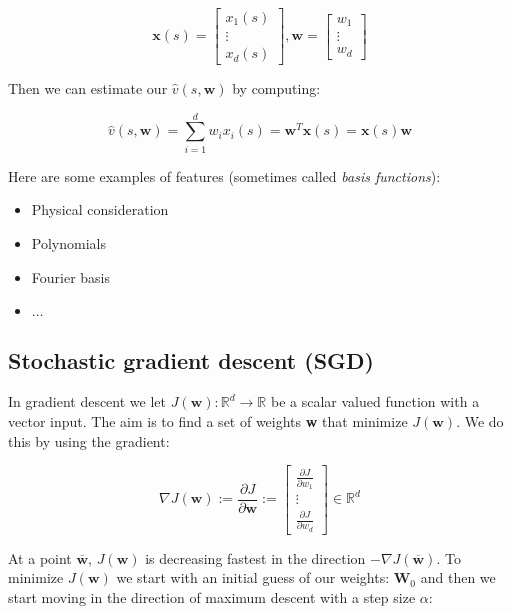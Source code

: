 	\begin{equation}
		\textbf{x}(s) = \begin{bmatrix} x_1(s) \\ \vdots \\ x_d(s) \end{bmatrix}, \textbf{w} = \begin{bmatrix} w_1 \\ \vdots \\ w_d \end{bmatrix}
	\end{equation}

Then we can estimate our $\hat{v}(s,\textbf{w})$ by computing:

	\begin{equation}
		\hat{v}(s, \textbf{w}) = \sum_{i=1}^{d}w_ix_i(s) = \textbf{w}^{T}\textbf{x}(s) = \textbf{x}(s)\textbf{w}
	\end{equation}

Here are some examples of features (sometimes called \emph{basis functions}):

\begin{itemize}
	\item Physical consideration
	\item Polynomials
	\item Fourier basis
	\item $\ldots$
\end{itemize}

\subsection{Stochastic gradient descent (SGD)}
In gradient descent we let $J(\textbf{w}): \mathbb{R}^{d} \rightarrow \mathbb{R}$ be a scalar valued function with a vector input. The aim is to find a set of weights \textbf{w} that minimize $J(\textbf{w})$. We do this by using the gradient:

	\begin{equation}
		\nabla J(\textbf{w}) := \frac{\partial J} {\partial \textbf{w}} := \begin{bmatrix} \frac{\partial J} {\partial w_1} \\ \vdots \\ \frac{\partial J} {\partial w_d}   \end{bmatrix} \in \mathbb{R}^{d}
	\end{equation}

At a point $\overline{\textbf{w}}$, $J(\textbf{w})$ is decreasing fastest in the direction $- \nabla J(\overline{\textbf{w}})$. To minimize $J(\textbf{w})$ we start with an initial guess of our weights: $\textbf{W}_0$ and then we start moving in the direction of maximum descent with a step size $\alpha$: 

